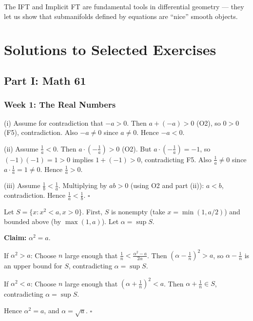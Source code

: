 \documentclass[11pt, letterpaper, openany]{book}
\newenvironment{solution}[1][Solution]{%
  \tcolorbox[blanker, breakable, left=1em,
    before skip=1em, after skip=1em,
    borderline west={2pt}{0pt}{MagicBlue},
    colback=MagicCream,
    before upper={\textcolor{MagicBlue}{\sffamily\bfseries #1.}\space}
  ]%
}{%
  \hfill\textcolor{MagicBlue}{\ensuremath{\square}}\endtcolorbox%
}
\begin{document}
\begin{remark}
The IFT and Implicit FT are fundamental tools in differential geometry --- they let us show that submanifolds defined by equations are ``nice'' smooth objects.
\end{remark}


\backmatter 

\chapter{Solutions to Selected Exercises}

\section*{Part I: Math 61}

\subsection*{Week 1: The Real Numbers}

\begin{solution}[1.1]
(i) Assume for contradiction that $-a > 0$. Then $a + (-a) > 0$ (O2), so $0 > 0$ (F5), contradiction. Also $-a \neq 0$ since $a \neq 0$. Hence $-a < 0$.

(ii) Assume $\frac{1}{a} < 0$. Then $a \cdot (-\frac{1}{a}) > 0$ (O2). But $a \cdot (-\frac{1}{a}) = -1$, so $(-1)(-1) = 1 > 0$ implies $1 + (-1) > 0$, contradicting F5. Also $\frac{1}{a} \neq 0$ since $a \cdot \frac{1}{a} = 1 \neq 0$. Hence $\frac{1}{a} > 0$.

(iii) Assume $\frac{1}{b} < \frac{1}{a}$. Multiplying by $ab > 0$ (using O2 and part (ii)): $a < b$, contradiction. Hence $\frac{1}{a} < \frac{1}{b}$.
\end{solution}

\begin{solution}[1.3]
Let $S = \{x : x^2 < a, x > 0\}$. First, $S$ is nonempty (take $x = \min(1, a/2)$) and bounded above (by $\max(1, a)$). Let $\alpha = \sup S$.

\textbf{Claim:} $\alpha^2 = a$.

If $\alpha^2 > a$: Choose $n$ large enough that $\frac{1}{n} < \frac{\alpha^2 - a}{2\alpha}$. Then $(\alpha - \frac{1}{n})^2 > a$, so $\alpha - \frac{1}{n}$ is an upper bound for $S$, contradicting $\alpha = \sup S$.

If $\alpha^2 < a$: Choose $n$ large enough that $(\alpha + \frac{1}{n})^2 < a$. Then $\alpha + \frac{1}{n} \in S$, contradicting $\alpha = \sup S$.

Hence $\alpha^2 = a$, and $\alpha = \sqrt{a}$.
\end{solution}
\end{document}
